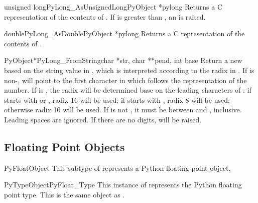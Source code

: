 \documentclass{manual}
\begin{document}
\begin{cfuncdesc}{unsigned long}{PyLong_AsUnsignedLong}{PyObject *pylong}
Returns a C  representation of the contents of 
.  If  is greater than
, an 
is raised.
\end{cfuncdesc}

\begin{cfuncdesc}{double}{PyLong_AsDouble}{PyObject *pylong}
Returns a C  representation of the contents of .
\end{cfuncdesc}

\begin{cfuncdesc}{PyObject*}{PyLong_FromString}{char *str, char **pend,
                                                int base}
Return a new  based on the string value in
, which is interpreted according to the radix in .
If  is non-\NULL,  will point to the first 
character in  which follows the representation of the
number.  If  is , the radix will be determined base
on the leading characters of : if  starts with
 or , radix 16 will be used; if  starts 
with , radix 8 will be used; otherwise radix 10 will be
used.  If  is not , it must be between  and
, inclusive.  Leading spaces are ignored.  If there are no
digits,  will be raised.
\end{cfuncdesc}


\subsection{Floating Point Objects \label{floatObjects}}

\begin{ctypedesc}{PyFloatObject}
This subtype of  represents a Python floating point
object.
\end{ctypedesc}

\begin{cvardesc}{PyTypeObject}{PyFloat_Type}
This instance of  represents the Python floating
point type.  This is the same object as .
\end{cvardesc}
\end{document}
